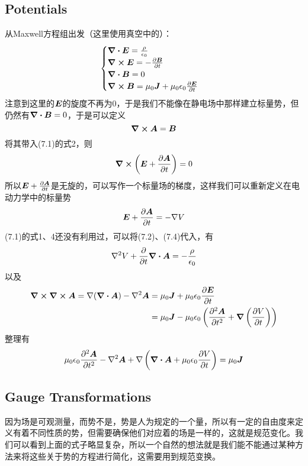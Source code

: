 \documentclass[14pt,oneside]{book}
\def \J{\vb*{J}}
\def \E{\vb*{E}}
\def \B{\vb*{B}}
\def \A{\vb*{A}}
\begin{document}
\begin{large}
\section{Potentials}
从Maxwell方程组出发（这里使用真空中的）：
\begin{align}
        \begin{cases} 
                \div{\vb*{E}}=\frac{\rho}{\epsilon_0}\\ 
                \curl{\vb*{E}}=-\pdv{\vb*{B}}{t} \\
                \div{\vb*{B}}=0\\
                \curl{\vb*{B}}=\mu_0\vb*{J}+\mu_0\epsilon_0\pdv{\vb*{E}}{t}& 
        \end{cases}
\end{align}
注意到这里的$\E$的旋度不再为0，于是我们不能像在静电场中那样建立标量势，但仍然有$\div\B=0$，于是可以定义
\begin{equation}
  \curl{\A}=\B
\end{equation}
将其带入(7.1)的式2，则
\begin{equation}
  \curl{\left(\E+\pdv{\A}{t}\right)}=0
\end{equation}
所以$\E+\pdv{\A}{t}$是无旋的，可以写作一个标量场的梯度，这样我们可以重新定义在电动力学中的标量势
\begin{equation}
  \E+\pdv{\A}{t}=-\nabla V
\end{equation}
(7.1)的式1、4还没有利用过，可以将(7.2)、(7.4)代入，有
\begin{align}
	\nabla^2V+\pdv{}{t}\div{\A}=-\frac{\rho}{\epsilon_0}
\end{align}
以及
\begin{equation}
  \begin{aligned}
	  \curl \curl \A=\nabla(\div{\A})-\nabla^2\A&=\mu_0\vb*{J}+\mu_0\epsilon_0\pdv{\vb*{E}}{t}	\\
	  &=\mu_0\vb*{J}-\mu_0\epsilon_0\left(\pdv[2]{\A}{t}+\grad\left(\pdv{V}{t}\right)\right)
\end{aligned}
\end{equation}
整理有
\begin{equation}
  \mu_0\epsilon_0\pdv[2]{\A}{t}-\nabla^2\A+\nabla\left(\div\A+\mu_0\epsilon_0\pdv{V}{t} \right)=\mu_0\J
\end{equation}


\subsection{Gauge Transformations}
因为场是可观测量，而势不是，势是人为规定的一个量，所以有一定的自由度来定义有着不同性质的势，但需要确保他们对应着的场是一样的，这就是规范变化。我们可以看到上面的式子略显复杂，所以一个自然的想法就是我们能不能通过某种方法来将这些关于势的方程进行简化，这需要用到规范变换。


\end{large}
\end{document}
